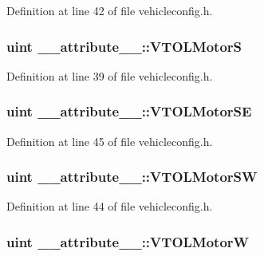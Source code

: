 \-Definition at line 42 of file vehicleconfig.\-h.

\hypertarget{group___config_plugin_ga454ee04b612bfb51636328cac0ecb30c}{
\subsubsection[{\-V\-T\-O\-L\-Motor\-S}]{\setlength{\rightskip}{0pt plus 5cm}uint {\bf \-\_\-\-\_\-attribute\-\_\-\-\_\-\-::\-V\-T\-O\-L\-Motor\-S}}}\label{group___config_plugin_ga454ee04b612bfb51636328cac0ecb30c}


\-Definition at line 39 of file vehicleconfig.\-h.

\hypertarget{group___config_plugin_gaa954495952cf0b6ae1f8a25d95ca09c0}{
\subsubsection[{\-V\-T\-O\-L\-Motor\-S\-E}]{\setlength{\rightskip}{0pt plus 5cm}uint {\bf \-\_\-\-\_\-attribute\-\_\-\-\_\-\-::\-V\-T\-O\-L\-Motor\-S\-E}}}\label{group___config_plugin_gaa954495952cf0b6ae1f8a25d95ca09c0}


\-Definition at line 45 of file vehicleconfig.\-h.

\hypertarget{group___config_plugin_ga6c7dfd25d7944b3ce84871fed9c6c9ef}{
\subsubsection[{\-V\-T\-O\-L\-Motor\-S\-W}]{\setlength{\rightskip}{0pt plus 5cm}uint {\bf \-\_\-\-\_\-attribute\-\_\-\-\_\-\-::\-V\-T\-O\-L\-Motor\-S\-W}}}\label{group___config_plugin_ga6c7dfd25d7944b3ce84871fed9c6c9ef}


\-Definition at line 44 of file vehicleconfig.\-h.

\hypertarget{group___config_plugin_ga702b69e8ffd06d1a761e28540e0706c0}{
\subsubsection[{\-V\-T\-O\-L\-Motor\-W}]{\setlength{\rightskip}{0pt plus 5cm}uint {\bf \-\_\-\-\_\-attribute\-\_\-\-\_\-\-::\-V\-T\-O\-L\-Motor\-W}}}\label{group___config_plugin_ga702b69e8ffd06d1a761e28540e0706c0}


